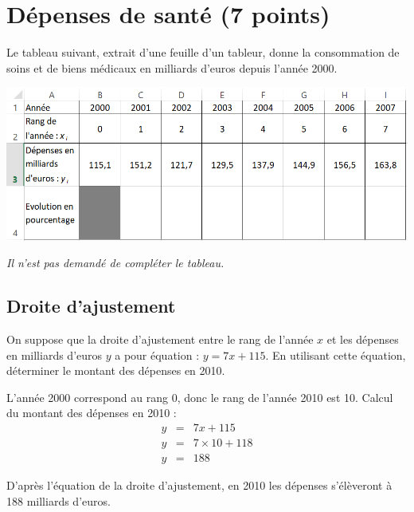 
\section{Dépenses de santé (7 points)}

Le tableau suivant, extrait d'une feuille d'un tableur, donne la consommation de soins et de biens médicaux en milliards d'euros depuis l'année 2000.

\begin{center}
	\includegraphics[scale=0.65]{img/biens_medicaux2}
\end{center}

\emph{Il n'est pas demandé de compléter le tableau.}

\subsection{Droite d'ajustement}

\begin{questions}
	\question[1] On suppose que la droite d'ajustement entre le rang de l'année $x$ et les dépenses en milliards d'euros $y$ a pour équation : $y = 7x + 115$. En utilisant cette équation, déterminer le montant des dépenses en 2010. 
	\begin{solution}
		L'année 2000 correspond au rang 0, donc le rang de l'année 2010 est 10. Calcul du montant des dépenses en 2010 :
		\begin{eqnarray*}
			y &=& 7x + 115 \\
			y &=& 7 \times 10 + 118 \\
			y &=& 188
		\end{eqnarray*}
	
	D'après l'équation de la droite d'ajustement, en 2010 les dépenses s'élèveront à 188 milliards d'euros.
	\end{solution}

\end{questions}

